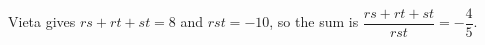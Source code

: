 Vieta gives $rs+rt+st=8$ and $rst=-10$, so the sum is $\dfrac{rs+rt+st}{rst}=\boxed{-\dfrac{4}{5}}$.
